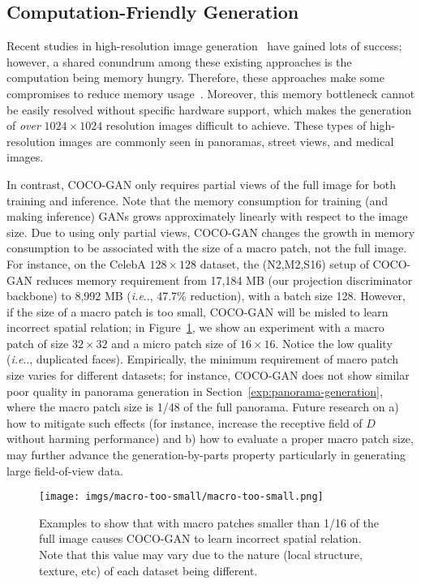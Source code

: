 \documentclass{article}
\makeatletter
\newcommand{\modelName}{COCO-GAN }
\DeclareRobustCommand\onedot{\futurelet\@let@token\@onedot}
\def\@onedot{\ifx\@let@token.\else.\null\fi\xspace}
\def\ie{\emph{i.e}\onedot} \def\Ie{\emph{I.e}\onedot}
\makeatother
\begin{document}
    \subsection{Computation-Friendly Generation}
    
        Recent studies in high-resolution image generation~\cite{PGGAN, R1-regularizer,intro-vae} have gained lots of success; however, a shared conundrum among these existing approaches is the computation being memory hungry. Therefore, these approaches make some compromises to reduce memory usage~\cite{PGGAN,R1-regularizer}. Moreover, this memory bottleneck cannot be easily resolved without specific hardware support, which makes the generation of \textit{over} $1024\times 1024$ resolution images difficult to achieve. These types of high-resolution images are commonly seen in panoramas, street views, and medical images. 
    
        In contrast, \modelName only requires partial views of the full image for both training and inference. Note that the memory consumption for training (and making inference) GANs grows approximately linearly with respect to the image size. Due to using only partial views, \modelName changes the growth in memory consumption to be associated with the size of a macro patch, not the full image. For instance, on the CelebA $128\times128$ dataset, the (N2,M2,S16) setup of \modelName reduces memory requirement from 17,184 MB (our projection discriminator backbone) to 8,992 MB (\ie, 47.7\% reduction), with a batch size 128. However, if the size of a macro patch is too small, \modelName will be misled to learn incorrect spatial relation; in Figure~\ref{fig:macro-too-small}, we show an experiment with a macro patch of size $32\times32$ and a micro patch size of $16\times16$. Notice the low quality (\ie, duplicated faces). Empirically, the minimum requirement of macro patch size varies for different datasets; for instance, \modelName does not show similar poor quality in panorama generation in Section~\ref{exp:panorama-generation}, where the macro patch size is 1/48 of the full panorama. Future research on a) how to mitigate such effects (for instance, increase the receptive field of $D$ without harming performance) and b) how to evaluate a proper macro patch size, may further advance the generation-by-parts property particularly in generating large field-of-view data.
        
        \begin{figure}[h]
            \centering
            \texttt{[image: imgs/macro-too-small/macro-too-small.png]}
            \caption{Examples to show that with macro patches smaller than 1/16 of the full image causes \modelName to learn incorrect spatial relation. Note that this value may vary due to the nature (local structure, texture, etc) of each dataset being different.}
            \label{fig:macro-too-small}
\end{figure}
        
\end{document}
